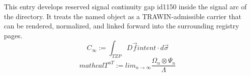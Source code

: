 
\begin{tzpsnapshot}
\end{tzpsnapshot}

This entry develops reserved signal continuity gap id1150 inside the signal arc of the directory. It treats the named object as a TRAWIN-admissible carrier that can be rendered, normalized, and linked forward into the surrounding registry pages.
\[
C_{\infty} := \int_{TZP} D \vec{f} {intent} \cdot d\vec{\sigma}
\]
\[
mathcal{T}^{uT}:=lim_{n\rightarrow\infty}\frac{\Omega_{n}\otimes\Psi_{n}}{\Lambda}
\]

